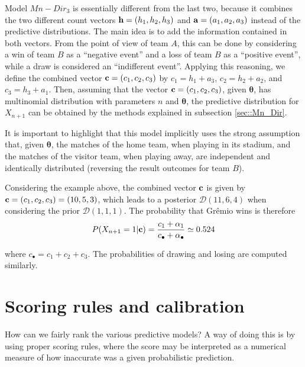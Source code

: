 \documentclass[journal,article,accept,moreauthors,pdftex,12pt,a4paper]{mdpi}
\begin{document}
	Model $Mn-Dir_3$ is essentially different from the
	last two, because it combines the two different count vectors ${\bf
		h} = (h_1, h_2, h_3)$ and ${\bf a} = (a_1, a_2, a_3)$ instead of the
	predictive distributions. The main idea is to add the information
	contained in both vectors. From the point of view of team $A$, this can
	be done by considering a win of team $B$ as a ``negative event'' and a
	loss of team $B$ as a ``positive event'', while a draw is
	considered an ``indifferent event''. Applying this reasoning,
	we define the combined vector ${\bf c} = (c_1, c_2, c_3)$ by $c_1 =
	h_1 + a_3$, $c_2 = h_2 + a_2$, and $c_3 = h_3 + a_1$. Then, assuming that the vector ${\bf c} = (c_1, c_2, c_3)$, given $\boldsymbol{\theta}$, has multinomial distribution with parameters $n$ and
	$\boldsymbol{\theta}$, the predictive distribution for $X_{n + 1}$ can
	be obtained by the methods explained in subsection
	\ref{sec::Mn_Dir}.
	
	It is important to highlight that this model implicitly uses the strong assumption that, given $\boldsymbol{\theta}$, the matches of the home team, when playing in its stadium, and the matches of the visitor team, when playing away, are independent and identically distributed (reversing the result outcomes for team $B$).
	
	Considering the example above, the combined vector ${\bf c}$ is given by ${\bf c}=(c_1,c_2,c_3)=(10,5,3)$, which leads to a posterior $\mathcal{D}(11,6,4)$ when considering the prior $\mathcal{D}(1,1,1)$.
	The probability that Gr\^emio wins is therefore	
	\[P(X_{n+1}=1|{\bf c})=\frac{c_1+\alpha_1}{c_{\bullet}+\alpha_{\bullet}}\simeq0.524
	\]
	
	\noindent
	where $c_{\bullet}=c_1+c_2+c_3$. The probabilities of drawing and losing are computed similarly.

	\section{Scoring rules and calibration}
	\label{sec::scoring}
	
	How can we fairly rank the various predictive models?
	A way of doing this is by using proper scoring rules, where
	the score may be interpreted as a numerical measure of how inaccurate was a given probabilistic prediction.
	
\end{document}
